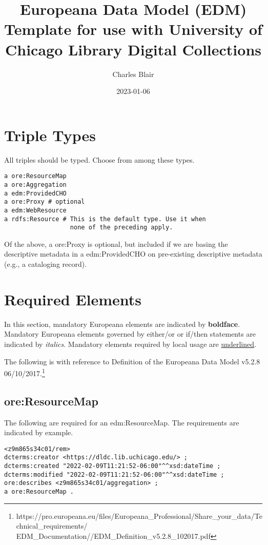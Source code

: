 \documentclass[11pt]{article}
\date{2023-01-06}
\title{Europeana Data Model (EDM) Template for use with University of Chicago Library Digital Collections}
\author{Charles Blair}
\begin{document}
\maketitle

\section{Triple Types}
All triples should be typed. Choose from among these types.

\begin{lstlisting}
a ore:ResourceMap
a ore:Aggregation
a edm:ProvidedCHO
a ore:Proxy # optional
a edm:WebResource
a rdfs:Resource # This is the default type. Use it when
                  none of the preceding apply.
\end{lstlisting}

Of the above, a ore:Proxy is optional, but included if we are basing the descriptive metadata in a edm:ProvidedCHO on pre-existing descriptive metadata (e.g., a cataloging record).

\section{Required Elements}
In this section, mandatory Europeana elements are indicated by \textbf{boldface}. Mandatory Europeana elements governed by either/or or if/then statements are indicated by \textit{italics}. Mandatory elements required by local usage are \underline{underlined}.

The following is with reference to Definition of the Europeana Data Model v5.2.8 06/10/2017.\footnote{https://pro.europeana.eu/files/Europeana\_Professional/Share\_your\_data/Technical\_requirements/
EDM\_Documentation//EDM\_Definition\_v5.2.8\_102017.pdf}

\subsection{ore:ResourceMap}

The following are required for an edm:ResourceMap. The requirements are indicated by example.

\begin{verbatim}
<z9m865s34c01/rem>
dcterms:creator <https://dldc.lib.uchicago.edu/> ;
dcterms:created "2022-02-09T11:21:52-06:00"^^xsd:dateTime ;
dcterms:modified "2022-02-09T11:21:52-06:00"^^xsd:dateTime ;
ore:describes <z9m865s34c01/aggregation> ;
a ore:ResourceMap .
\end{verbatim}
\end{document}
